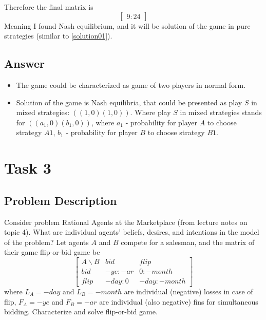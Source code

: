 \documentclass[
	a4paper, %
	11pt, %
]{CSUniSchoolLabReport}
\begin{document}
Therefore the final matrix is
$$
\begin{bmatrix}
    9:24
\end{bmatrix}
$$
Meaning I found Nash equilibrium, and it will be solution of the game in pure strategies (similar to \ref{solution01}).

\subsection{Answer}\label{answer02}
\begin{itemize}
    \item The game could be characterized as game of two players in normal form.
    \item Solution of the game is Nash equilibria, that could be presented as play $S$ in mixed strategies: $((1, 0)(1, 0))$. Where play $S$ in mixed strategies stands for $((a_1, 0)(b_1, 0))$, where $a_1$ - probability for player $A$ to choose strategy $A1$, $b_1$ - probability for player $B$ to choose strategy $B1$.
\end{itemize}


\section{Task 3}

\subsection{Problem Description}\label{writeup03}
Consider problem Rational Agents at the Marketplace (from lecture notes on topic 4). What are individual agents’ beliefs, desires, and intentions in the model of the problem? Let agents $A$ and $B$ compete for a salesman, and the matrix of their game flip-or-bid game be
$$
\begin{bmatrix}
    A\backslash B & bid & flip \\
    bid & -ye:-ar & 0:-month \\
    flip & -day:0 & -day:-month
\end{bmatrix}
$$
where $L_A = -day$ and $L_B = -month$ are individual (negative) losses in case of flip, $F_A = -ye$ and $F_B = -ar$ are individual (also negative) fins for simultaneous bidding. Characterize and solve flip-or-bid game.
\end{document}
